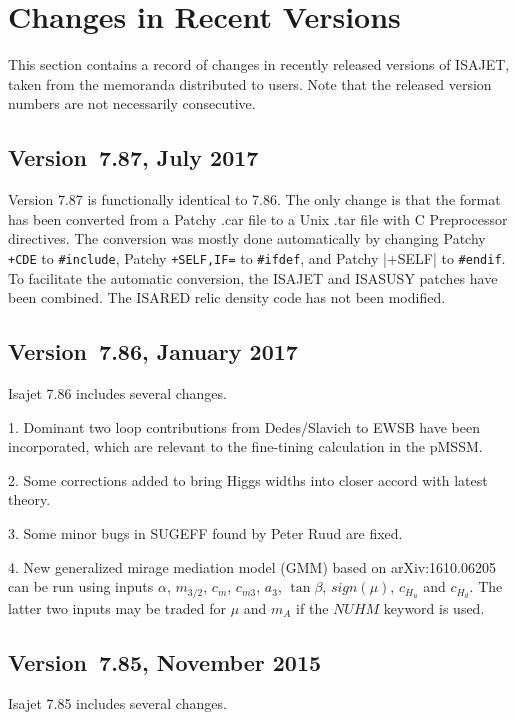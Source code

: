 \newpage
\section{Changes in Recent Versions}

        This section contains a record of changes in recently released
versions of ISAJET, taken from the memoranda distributed to users.
Note that the released version numbers are not necessarily consecutive.

\subsection{Version~7.87, July 2017}

Version 7.87 is functionally identical to 7.86. The only change is that
the format has been converted from a Patchy .car file to a Unix .tar
file with C Preprocessor directives. The conversion was mostly done
automatically by changing Patchy \verb|+CDE| to \verb|#include|,
Patchy \verb|+SELF,IF=| to \verb|#ifdef|, and Patchy |+SELF| to
\verb|#endif|. To facilitate the automatic conversion, the ISAJET and
ISASUSY patches have been combined. The ISARED relic density code has
not been modified.

\subsection{Version~7.86, January 2017}

Isajet 7.86 includes several changes.

1. Dominant two loop contributions from Dedes/Slavich to EWSB have been
incorporated, which are relevant to the fine-tining calculation in the pMSSM.

2. Some corrections added to bring Higgs widths into closer accord with
latest theory.

3. Some minor bugs in SUGEFF found by Peter Ruud are fixed.

4. New generalized mirage mediation model (GMM) based on arXiv:1610.06205
can be run using inputs $\alpha$, $m_{3/2}$, $c_m$, $c_{m3}$, $a_3$, $\tan\beta$,
$sign (\mu )$, $c_{H_u}$ and $c_{H_d}$. The latter two inputs may be traded
for $\mu$ and $m_A$ if the $NUHM$ keyword is used.

\subsection{Version~7.85, November 2015}

Isajet 7.85 includes several changes.

